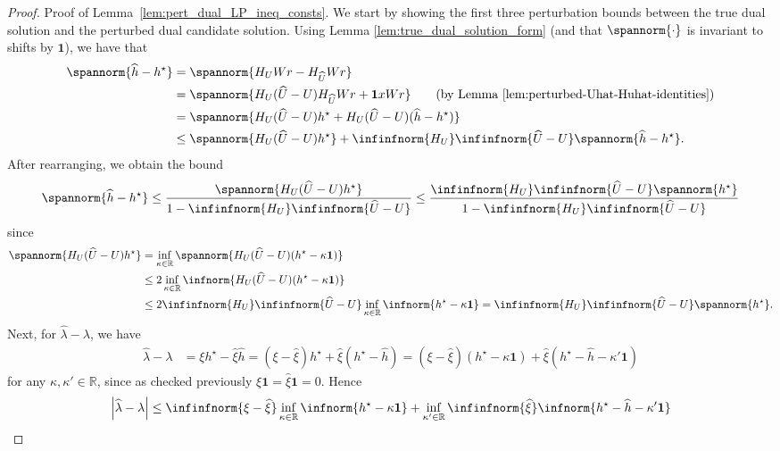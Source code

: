 \documentclass[mnsc,nonblindrev]{informs3}
\newcommand{\R}{\mathbb{R}}
\newcommand{\one}{\mathbf{1}}
\newcommand{\hhat}{\widehat{h}}
\newcommand{\uhat}{\widehat{U}}
\newcommand{\xihat}{\widehat{\xi}}
\newcommand{\lambdahat}{\widehat{\lambda}}
\begin{document}
\begin{APPENDICES}
\begin{proof}{Proof of Lemma~\ref{lem:pert_dual_LP_ineq_consts}.}
We start by showing the first three perturbation bounds between the true dual solution and the perturbed dual candidate solution.
Using Lemma \ref{lem:true_dual_solution_form} (and that $\spannorm{\cdot}$ is invariant to shifts by $\one$), we have that
\begin{align*}
    \spannorm{\hhat - h^\star} 
    & =\spannorm{H_UWr-H_{\uhat}Wr}\\
    &= \spannorm{H_U(\uhat-U)H_{\uhat}Wr + \one x Wr} \tag{by Lemma~\ref{lem:perturbed-Uhat-Huhat-identities}}\\
    &= \spannorm{H_U (\uhat-U) h^\star + H_U (\uhat-U) (\hhat-h^\star)} \\
    & \le \spannorm{H_U (\uhat-U) h^\star} + \infinfnorm{H_U} \infinfnorm{\uhat-U} \spannorm{\hhat-h^\star} .
\end{align*}
After rearranging, we obtain the bound
\begin{align*}
    \spannorm{\hhat - h^\star} \leq \frac{\spannorm{H_U (\uhat-U) h^\star}}{1-\infinfnorm{H_U} \infinfnorm{\uhat-U}} \leq \frac{\infinfnorm{H_U} \infinfnorm{\uhat - U} \spannorm{h^\star}}{1-\infinfnorm{H_U} \infinfnorm{\uhat-U}}
\end{align*}
since
\begin{align*}
    \spannorm{H_U (\uhat-U) h^\star} &= \inf_{\kappa \in \R} \spannorm{H_U (\uhat-U) (h^\star- \kappa \one)}\\
    &\leq 2 \inf_{\kappa \in \R}\infnorm{H_U (\uhat-U) (h^\star- \kappa \one)} \\
    &\leq 2 \infinfnorm{H_U} \infinfnorm{\uhat - U} \inf_{\kappa \in \R}\infnorm{h^\star - \kappa \one} 
    = \infinfnorm{H_U} \infinfnorm{\uhat - U} \spannorm{h^\star}.
\end{align*}
Next, for $\lambdahat-\lambda$, we have
\begin{align*}
    \lambdahat - \lambda &= \xi h^\star - \xihat \hhat 
    = (\xi - \xihat) h^\star + \xihat (h^\star - \hhat) 
    = (\xi - \xihat) (h^\star - \kappa \one) + \xihat (h^\star - \hhat - \kappa' \one)
\end{align*}
for any $\kappa, \kappa' \in \R$, since as checked previously $\xi \one = \xihat \one = 0$. Hence
\begin{align*}
    \left| \lambdahat - \lambda \right| & \leq \infinfnorm{\xi - \xihat} \inf_{\kappa \in \R}\infnorm{h^\star - \kappa \one} +  \inf_{\kappa' \in \R}\infinfnorm{\xihat} \infnorm{h^\star - \hhat - \kappa' \one} \\

\end{align*}
\end{proof}
\end{APPENDICES}
\end{document}
